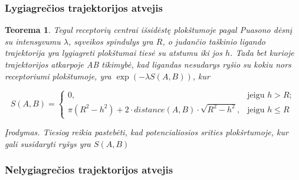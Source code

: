 \documentclass[10pt]{article}
\newtheorem{thm}{Teorema}
\begin{document}
\subsubsection{Lygiagrečios trajektorijos atvejis}

\begin{thm}\label{thm:2}
Tegul receptorių centrai išsidėstę plokštumoje  pagal Puasono dėsnį su intensyvumu $\lambda$,  sąveikos spindulys yra $R$, o judančio taškinio ligando trajektorija yra lygiagreti plokštumai tiesė su atstumu iki jos  $ h $. Tada bet kurioje trajektorijos atkarpoje AB tikimybė, kad ligandas nesudarys ryšio su kokiu nors receptoriumi plokštumoje, yra $ \exp( -\lambda S(A,B)) $, kur 

\[
S(A,B) =
\begin{cases}
0, & \text{jeigu } h>R; \\

\pi(R^2-h^2) + 2 \cdot distance(A,B) \cdot \sqrt{R^2-h^2}, & 
 \text{jeigu }  h \leqslant R

\end{cases}
\]

Įrodymas. Tiesiog reikia pastebėti, kad potencialiosios srities plokšrtumoje, kur gali susidaryti ryšys yra $ S(A,B) $

\end{thm}

\subsubsection{Nelygiagrečios trajektorijos atvejis}
\end{document}
